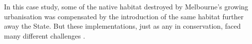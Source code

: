 \documentclass[12pt,a4paper]{article}
\begin{document}
In this case study, some of the native habitat destroyed by Melbourne's growing urbanisation was compensated by the introduction of the same habitat further away the State.
But these implementations, just as any in conservation, faced many different challenges \citep{keith2011uncertainty, vanwilgen2011critical}.\\
%
\end{document}
